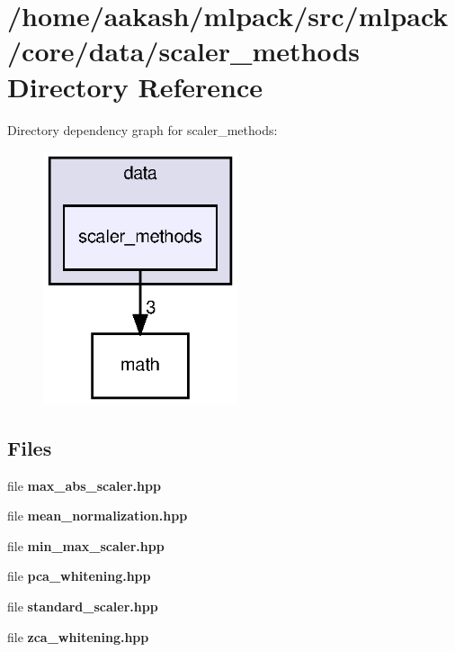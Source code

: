 \section{/home/aakash/mlpack/src/mlpack/core/data/scaler\+\_\+methods Directory Reference}
\label{dir_6ade863400420cbafe9b627c022cdcda}
Directory dependency graph for scaler\+\_\+methods\+:
\nopagebreak
\begin{figure}[H]
\begin{center}
\leavevmode
\includegraphics[width=162pt]{dir_6ade863400420cbafe9b627c022cdcda_dep}
\end{center}
\end{figure}
\subsection*{Files}
\begin{DoxyCompactItemize}
\item 
file \textbf{ max\+\_\+abs\+\_\+scaler.\+hpp}
\item 
file \textbf{ mean\+\_\+normalization.\+hpp}
\item 
file \textbf{ min\+\_\+max\+\_\+scaler.\+hpp}
\item 
file \textbf{ pca\+\_\+whitening.\+hpp}
\item 
file \textbf{ standard\+\_\+scaler.\+hpp}
\item 
file \textbf{ zca\+\_\+whitening.\+hpp}
\end{DoxyCompactItemize}
